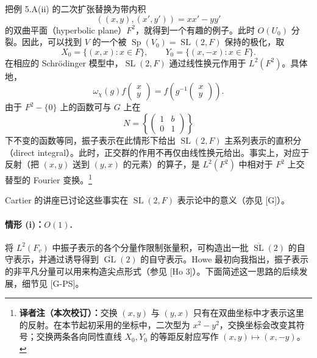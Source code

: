 把例 5.A(ii) 的二次扩张替换为带内积
\[
 ((x,y),(x',y'))=xx'-yy'
\]
的双曲平面（hyperbolic plane）$F^2$，就得到一个有趣的例子。此时 $O(U_0)$ 分裂。因此，可以找到 $V$ 的一个被 $\operatorname{Sp}(V_0)=\operatorname{SL}(2,F)$ 保持的极化，取
\[
 X_0=\{(x,x):x\in F\},\qquad Y_0=\{(x,-x):x\in F\}.
\]
在相应的 Schrödinger 模型中，$\operatorname{SL}(2,F)$ 通过线性换元作用于 $L^2(F^2)$。具体地，
\[
 \omega_\chi(g)f\!\begin{pmatrix}x\\y\end{pmatrix}
 =f\!\left(g^{-1}\!\begin{pmatrix}x\\y\end{pmatrix}\right).
\]
由于 $F^2-\{0\}$ 上的函数可与 $G$ 上在
\[
 N=\left\{\begin{pmatrix}1&b\\0&1\end{pmatrix}\right\}
\]
下不变的函数等同，振子表示在此情形下给出 $\operatorname{SL}(2,F)$ 主系列表示的直积分（direct integral）。此时，正交群的作用不再仅由线性换元给出。事实上，对应于反射（把 $(x,y)$ 送到 $(y,x)$ 的元素）的算子，是 $L^2(F^2)$ 中相对于 $F^2$ 上交替型的 Fourier 变换。\footnote{\textbf{译者注（本次校订）：}交换 $(x,y)$ 与 $(y,x)$ 只有在双曲坐标中才表示这里的反射。在本节起初采用的坐标中，二次型为 $x^2-y^2$，交换坐标会改变其符号；交换两条各向同性直线 $X_0,Y_0$ 的等距反射应写作 $(x,y)\mapsto(x,-y)$。}

Cartier 的讲座已讨论这些事实在 $\operatorname{SL}(2,F)$ 表示论中的意义（亦见 [G]）。

\paragraph*{情形 (i)：$O(1)$.}
将 $L^2(F_v)$ 中振子表示的各个分量作限制张量积，可构造出一批 $\overline{\operatorname{SL}}(2)$ 的自守表示，并通过诱导得到 $\overline{\operatorname{GL}}(2)$ 的自守表示。Howe 最初向我指出，振子表示的非平凡分量可以用来构造尖点形式（参见 [Ho 3]）。下面简述这一思路的后续发展，细节见 [G-PS]。

